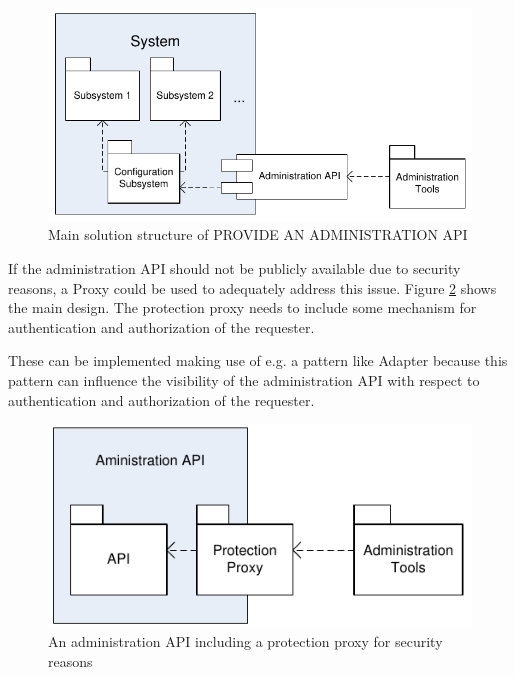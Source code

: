 \begin{figure}[h]
\centering
\includegraphics{patterns/provideAPIDiagram-01.pdf}
\caption{Main solution structure of PROVIDE AN ADMINISTRATION API}
\label{fig:provideAPIDiagram-01}
\end{figure}

If the administration API should not be publicly available due to security reasons, a {\sc Proxy} \cite{Buschmann1996} could be used to adequately address this issue. Figure \ref{fig:provideAPIDiagram-02} shows the main design. The protection proxy needs to include some mechanism for authentication and authorization of the requester.

These can be implemented making use of e.g. a pattern like {\sc Adapter} \cite{Gamma95} because this pattern can influence the visibility of the administration API with respect to authentication and authorization of the requester.

\begin{figure}[h]
\centering
\includegraphics{patterns/provideAPIDiagram-02.pdf}
\caption{An administration API including a protection proxy for security reasons}
\label{fig:provideAPIDiagram-02}
\end{figure}

